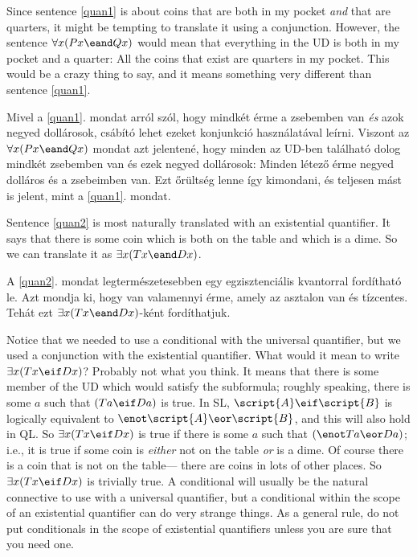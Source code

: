 
Since sentence \ref{quan1} is about coins that are both in my pocket \emph{and} that are quarters, it might be tempting to translate it using a conjunction. However, the sentence $\forall x(Px \eand Qx)$ would mean that everything in the UD is both in my pocket and a quarter: All the coins that exist are quarters in my pocket. This would be a crazy thing to say, and it means something very different than sentence \ref{quan1}.

Mivel a \ref{quan1}. mondat arról szól, hogy mindkét érme a zsebemben van \emph{és} azok negyed dollárosok, csábító lehet ezeket konjunkció használatával leírni. Viszont az $\forall x(Px \eand Qx)$ mondat azt jelentené, hogy minden az UD-ben található dolog mindkét zsebemben van és ezek negyed dollárosok: Minden létező érme negyed dolláros és a zsebeimben van. Ezt őrültség lenne így kimondani, és teljesen mást is jelent, mint a \ref{quan1}. mondat.  

Sentence \ref{quan2} is most naturally translated with an existential quantifier. It says that there is some coin which is both on the table and which is a dime. So we can translate it as $\exists x(Tx \eand Dx)$.

A \ref{quan2}. mondat legtermészetesebben egy egzisztenciális kvantorral fordítható le. Azt mondja ki, hogy van valamennyi érme, amely az asztalon van és tízcentes. Tehát ezt $\exists x(Tx \eand Dx)$-ként fordíthatjuk.

Notice that we needed to use a conditional with the universal quantifier, but we used a conjunction with the existential quantifier. What would it mean to write $\exists x(Tx \eif Dx)$? Probably not what you think. It means that there is some member of the UD which would satisfy the subformula; roughly speaking, there is some $a$ such that $(Ta \eif Da)$ is true. In SL, $\script{A} \eif \script{B}$ is logically equivalent to $\enot\script{A} \eor \script{B}$, and this will also hold in QL. So $\exists x(Tx \eif Dx)$ is true if there is some $a$ such that $(\enot Ta \eor Da)$; i.e., it is true if some coin is \emph{either} not on the table \emph{or} is a dime. Of course there is a coin that is not on the table--- there are coins in lots of other places. So $\exists x(Tx \eif Dx)$ is trivially true. A conditional will usually be the natural connective to use with a universal quantifier, but a conditional within the scope of an existential quantifier can do very strange things. As a general rule, do not put conditionals in the scope of existential quantifiers unless you are sure that you need one.

